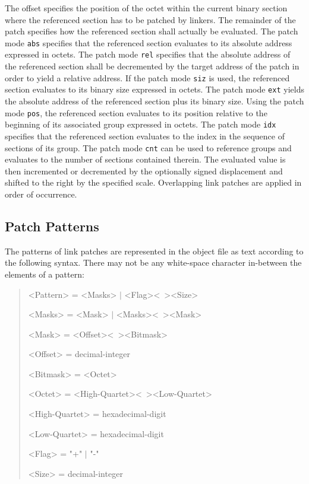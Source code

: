The offset specifies the position of the octet within the current binary section where the referenced section has to be patched by linkers.
The remainder of the patch specifies how the referenced section shall actually be evaluated.
The patch mode \texttt{abs} specifies that the referenced section evaluates to its absolute address expressed in octets.
The patch mode \texttt{rel} specifies that the absolute address of the referenced section shall be decremented by the target address of the patch in order to yield a relative address.
If the patch mode \texttt{siz} is used, the referenced section evaluates to its binary size expressed in octets.
The patch mode \texttt{ext} yields the absolute address of the referenced section plus its binary size.
Using the patch mode \texttt{pos}, the referenced section evaluates to its position relative to the beginning of its associated group expressed in octets.
The patch mode \texttt{idx} specifies that the referenced section evaluates to the index in the sequence of sections of its group.
The patch mode \texttt{cnt} can be used to reference groups and evaluates to the number of sections contained therein.
The evaluated value is then incremented or decremented by the optionally signed displacement and shifted to the right by the specified scale.
Overlapping link patches are applied in order of occurrence.

\subsection{Patch Patterns}

The patterns of link patches are represented in the object file as text according to the following syntax.
There may not be any white-space character in-between the elements of a pattern:

\begin{quote}\begin{grammar}
<Pattern> = <Masks> $\mid$ <Flag><\ ><Size> \par
<Masks> = <Mask> $\mid$ <Masks><\ ><Mask> \par
<Mask> = <Offset><\ ><Bitmask> \par
<Offset> = decimal-integer \par
<Bitmask> = <Octet> \par
<Octet> = <High-Quartet><\ ><Low-Quartet> \par
<High-Quartet> = hexadecimal-digit \par
<Low-Quartet> = hexadecimal-digit \par
<Flag> = "+" $\mid$ "-" \par
<Size> = decimal-integer \par
\end{grammar}\end{quote}

